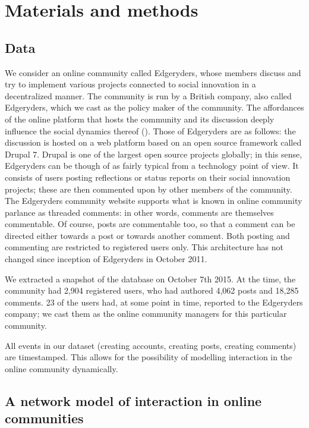 \section{Materials and methods}

\subsection{Data}

We consider an online community called Edgeryders, whose members discuss and try to implement various projects connected to social innovation in a decentralized manner. The community is run by a British company, also called Edgeryders, which we cast as the policy maker of the community. The affordances of the online platform that hosts the community and its discussion deeply influence the social dynamics thereof (\cite{hodas2014simple}). Those of Edgeryders are as follows: the discussion is hosted on a web platform based on an open source framework called Drupal 7. Drupal is one of the largest open source projects globally; in this sense, Edgeryders can be though of as fairly typical from a technology point of view. It consists of users posting reflections or status reports on their social innovation projects; these are then commented upon by other members of the community. The Edgeryders community website supports what is known in online community parlance as threaded comments: in other words, comments are themselves commentable. Of course, posts are commentable too, so that a comment can be directed either towards a post or towards another comment. Both posting and commenting are restricted to registered users only. This architecture has not changed since inception of Edgeryders in October 2011.


We extracted a snapshot of the database on October 7th 2015. At the time, the community had 2,904 registered users, who had authored 4,062 posts and 18,285 comments. 23 of the users had, at some point in time, reported to the Edgeryders company; we cast them as the online community managers for this particular community. 	

All events in our dataset (creating accounts, creating posts, creating comments) are timestamped. This allows for the possibility of modelling interaction in the online community dynamically. 

\subsection{A network model of interaction in online communities}

